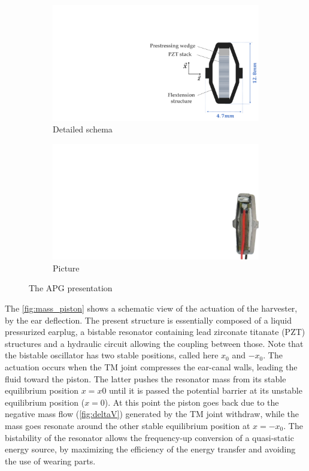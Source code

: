 \documentclass[3p,twocolumn,preprint]{elsarticle}
\def \hfillx {\hspace*{ -\linewidth} \hfill} %
\begin{document}
\begin{figure}[!htb]
	\begin{center}
		\begin{subfigure}[t]{0.6\linewidth}
			\captionsetup{justification=centering}
			\includegraphics[trim={16cm 0cm 0cm 6cm},clip,width=\linewidth]{figures/APG_schema.pdf}
			\caption{Detailed schema}
			\label{fig:APG_schema}
		\end{subfigure}
		\hfillx
		\begin{subfigure}[t]{0.29\linewidth}
			\captionsetup{justification=centering}
			\includegraphics[trim={29.5cm 0cm 0cm 8cm},clip,width=0.65\linewidth]{figures/APG_photo.pdf}
			\caption{Picture}
			\label{fig:APG_photo}
		\end{subfigure}
		\caption{The APG presentation}
		\label{fig:APG}
	\end{center}
\end{figure}
The \cref{fig:mass_piston} shows a schematic view of the actuation of the harvester, by the ear deflection. The present structure is essentially composed of a liquid pressurized earplug, a bistable resonator containing lead zirconate titanate (PZT) structures and a hydraulic circuit allowing the coupling between those. Note that the bistable oscillator has two stable positions, called here $x_0$ and $-x_0$. The actuation occurs when the TM joint compresses the ear-canal walls, leading the fluid toward the piston. The latter pushes the resonator mass from its stable equilibrium position $x=x0$ until it is passed the potential barrier at its unstable equilibrium position ($x=0$). At this point the piston goes back due to the negative mass flow (\cref{fig:deltaV}) generated by the TM joint withdraw, while the mass goes resonate around the other stable equilibrium position at $x=-x_0$. The bistability of the resonator allows the frequency-up conversion of a quasi-static energy source, by maximizing the efficiency of the energy transfer and avoiding the use of wearing parts.\\
\end{document}
